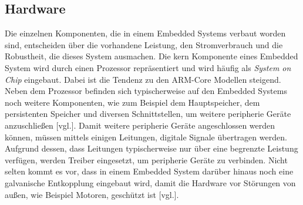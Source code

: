 \subsection{Hardware}
\label{subsec:EmbeddedHardware}
Die einzelnen Komponenten, die in einem Embedded Systems verbaut worden sind, entscheiden über
die vorhandene Leistung, den Stromverbrauch und die Robustheit, die dieses System ausmachen. Die
kern Komponente eines Embedded System wird durch einen Prozessor repräsentiert und
wird häufig als \emph{System on Chip} eingebaut. Dabei ist die Tendenz zu den ARM-Core Modellen
steigend. Neben dem Prozessor befinden sich typischerweise auf den Embedded Systems noch
weitere Komponenten, wie zum Beispiel dem Hauptspeicher, dem persistenten Speicher und diversen
Schnittstellen, um weitere peripherie Geräte anzuschließen \cite{EmbeddedLinuxQuade}[vgl.].
\newline
\newline
Damit weitere peripherie Geräte angeschlossen werden können, müssen mittels einigen Leitungen,
digitale Signale übertragen werden. Aufgrund dessen, dass Leitungen typischerweise nur über eine
begrenzte Leistung verfügen, werden Treiber eingesetzt, um peripherie Geräte zu verbinden.
Nicht selten kommt es vor, dass in einem Embedded System darüber hinaus noch eine galvanische
Entkopplung eingebaut wird, damit die Hardware
vor Störungen von außen, wie Beispiel Motoren, geschützt ist \cite{EmbeddedLinuxQuade}[vgl.].